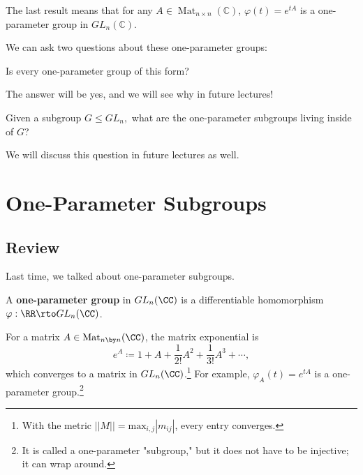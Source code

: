 The last result means that for any $A \in \operatorname{Mat}_{n \times n}(\mathbb{C})$, $\varphi(t) = e^{tA}$ is a one-parameter group in $GL_n(\mathbb{C})$. 

We can ask two questions about these one-parameter groups:

\begin{qq}
Is every one-parameter group of this form?
\end{qq}

The answer will be yes, and we will see why in future lectures!

\begin{qq}
Given a subgroup $G \leq GL_n,$ what are the one-parameter subgroups living inside of $G$?
\end{qq}

We will discuss this question in future lectures as well. 

\newpage


\section{One-Parameter Subgroups}

\subsection{Review}
Last time, we talked about one-parameter subgroups. 
\begin{definition}
A \textbf{one-parameter group} in $GL_n(\CC)$ is a differentiable homomorphism $\varphi: \RR \rto GL_n(\CC)$. 
\end{definition}

For a matrix $A \in \text{Mat}_{n \by n}(\CC)$, the matrix exponential is 
\[
e^A \coloneqq 1 + A + \frac{1}{2!}A^2 + \frac{1}{3!}A^3 + \cdots,
\]
which converges to a matrix in $GL_n(\CC)$.\footnote{With the metric $||M|| = \text{max}_{i, j}|m_{ij}|$, every entry converges.} For example, $\varphi_A(t) = e^{tA}$ is a one-parameter group.\footnote{It is called a one-parameter "subgroup," but it does not have to be injective; it can wrap around.}

